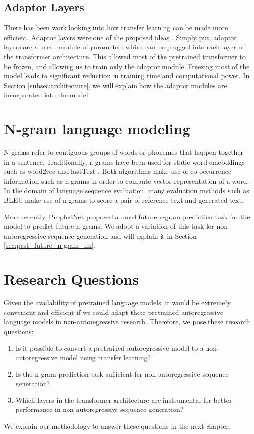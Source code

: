 \subsection{Adaptor Layers}\label{subsec:adaptor_layers}
There has been work looking into how transfer learning can be made more efficient. Adaptor layers \cite{bapna_simple_2019_adaptor1,houlsby_parameter-efficient_2019_adaptor2} were one of the proposed ideas . Simply put, adaptor layers are a small module of parameters which can be plugged into each layer of the transformer architecture. This allowed most of the pretrained transformer to be frozen, and allowing us to train only the adaptor module. Freezing most of the model leads to significant reduction in training time and computational power. In Section \ref{subsec:architecture}, we will explain how the adaptor modules are incorporated into the model. 

\section{N-gram language modeling} \label{sec:ngram_lm}
N-grams refer to contiguous groups of words or  phonemes that happen together in a sentence. Traditionally, n-grams have been used for static word emebddings such as word2vec \cite{mikolov_efficient_2013_word2vec} and fastText \cite{bojanowski_enriching_2017_fasttext}. Both algorithms make use of co-occurrence information such as n-grams in order to compute vector representation of a word. In the domain of language sequence evaluation, many evaluation methods such as BLEU \cite{papineni_bleu_2002} make use of n-grams to score a pair of reference text and generated text.

More recently, ProphetNet \cite{qi_prophetnet_2020} proposed a novel future n-gram prediction task for the model to predict future n-grams. We adopt a variation of this task for non-autoregressive sequence generation and will explain it in Section \ref{sec:past_future_n-gram_lm}.


\section{Research Questions}
Given the availability of pretrained language models, it would be extremely convenient and efficient if we could adapt these pretrained autoregressive language models in non-autoregressive research. Therefore, we pose these research questions:

\begin{enumerate}
    \item Is it possible to convert a pretrained autoregressive model to a non-autoregressive model using transfer learning?
    \item Is the n-gram prediction task sufficient for non-autoregressive sequence generation?
    \item Which layers in the transformer architecture are instrumental for better performance in non-autoregressive sequence generation?
\end{enumerate}

We explain our methodology to answer these questions in the next chapter.